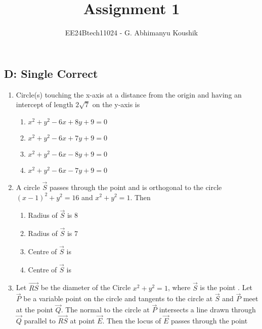 \documentclass[journal,12pt,twocolumn]{IEEEtran}
\theoremstyle{remark}
\begin{document}
\title{Assignment 1}
\author{EE24Btech11024 - G. Abhimanyu Koushik}
\maketitle
\renewcommand{\thefigure}{\theenumi}
\renewcommand{\thetable}{\theenumi}
\subsection*{D: Single Correct}
\begin{enumerate}
\item Circle(s) touching the x-axis at a distance  from the origin and having an intercept of length $2\sqrt{7}$ on the y-axis is 

\hfill{}
\begin{enumerate}[label=(\alph*)]
\item $x^2 + y^2 - 6x + 8y + 9 = 0$
\item $x^2 + y^2 - 6x + 7y + 9 = 0$
\item $x^2 + y^2 - 6x - 8y + 9 = 0$
\item $x^2 + y^2 - 6x - 7y + 9 = 0$
\end{enumerate}
\item A circle $\vec{S}$ passes through the point  and is orthogonal to the circle $(x-1)^2+y^2=16$ and $x^2+y^2=1$. Then

\hfill {}
\begin{enumerate}[label=(\alph*)]
\item Radius of $\vec{S}$ is $8$
\item Radius of $\vec{S}$ is $7$
\item Centre of $\vec{S}$ is 
\item Centre of $\vec{S}$ is 
\end{enumerate}
\item Let $\vec{RS}$ be the diameter of the Circle $x^{2} + y^{2} = 1$, where $\vec{S}$ is the point . Let $\vec{P}$ be a variable point  on the circle and tangents to the circle at $\vec{S}$ and $\vec{P}$ meet at the point $\vec{Q}$. The normal to the circle at $\vec{P}$ intersects a line drawn through $\vec{Q}$ parallel to $\vec{RS}$ at point $\vec{E}$. Then the locus of $\vec{E}$ passes through the point 


\end{enumerate}
\end{document}
